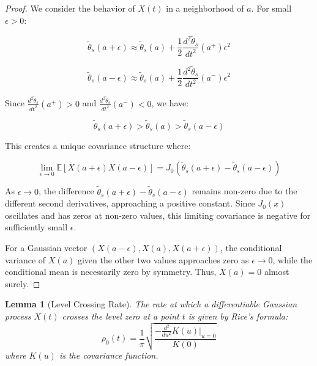 \documentclass{article}
\newtheorem{lemma}[theorem]{Lemma}
\theoremstyle{definition}
\begin{document}
\begin{proof}
We consider the behavior of $X(t)$ in a neighborhood of $a$. For small $\epsilon > 0$:

\begin{equation}
\tilde{\theta}_s(a+\epsilon) \approx \tilde{\theta}_s(a) + \frac{1}{2}\frac{d^2\tilde{\theta}_s}{dt^2}(a^+)\epsilon^2
\end{equation}

\begin{equation}
\tilde{\theta}_s(a-\epsilon) \approx \tilde{\theta}_s(a) + \frac{1}{2}\frac{d^2\tilde{\theta}_s}{dt^2}(a^-)\epsilon^2
\end{equation}

Since $\frac{d^2\tilde{\theta}_s}{dt^2}(a^+) > 0$ and $\frac{d^2\tilde{\theta}_s}{dt^2}(a^-) < 0$, we have:

\begin{equation}
\tilde{\theta}_s(a+\epsilon) > \tilde{\theta}_s(a) > \tilde{\theta}_s(a-\epsilon)
\end{equation}

This creates a unique covariance structure where:

\begin{equation}
\lim_{\epsilon \to 0} \mathbb{E}[X(a+\epsilon)X(a-\epsilon)] = J_0(\tilde{\theta}_s(a+\epsilon) - \tilde{\theta}_s(a-\epsilon))
\end{equation}

As $\epsilon \to 0$, the difference $\tilde{\theta}_s(a+\epsilon) - \tilde{\theta}_s(a-\epsilon)$ remains non-zero due to the different second derivatives, approaching a positive constant. Since $J_0(x)$ oscillates and has zeros at non-zero values, this limiting covariance is negative for sufficiently small $\epsilon$.

For a Gaussian vector $(X(a-\epsilon), X(a), X(a+\epsilon))$, the conditional variance of $X(a)$ given the other two values approaches zero as $\epsilon \to 0$, while the conditional mean is necessarily zero by symmetry. Thus, $X(a) = 0$ almost surely.
\end{proof}

\begin{lemma}[Level Crossing Rate]
The rate at which a differentiable Gaussian process $X(t)$ crosses the level zero at a point $t$ is given by Rice's formula:
\begin{equation}
\rho_0(t) = \frac{1}{\pi}\sqrt{\frac{-\frac{d^2}{du^2}K(u)|_{u=0}}{K(0)}}
\end{equation}
where $K(u)$ is the covariance function.
\end{lemma}
\end{document}
